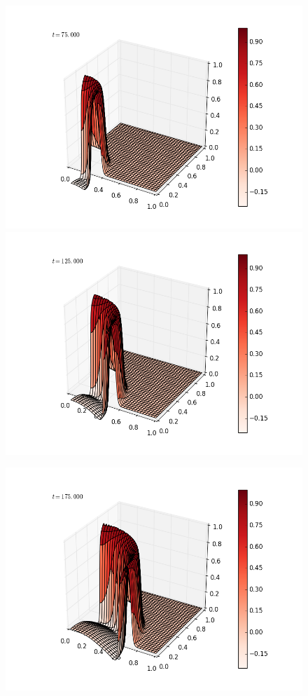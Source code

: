 \documentclass[12pt]{article}
\begin{document}
\begin{enumerate}[(a)]
\begin{figure}[H]
\end{figure}
\begin{figure}[H]
\includegraphics[scale=0.4]{partb_fast_frames/partb_fast_fig05.png}%
\includegraphics[scale=0.4]{partb_fast_frames/partb_fast_fig07.png}
\end{figure}
\begin{figure}[H]
\includegraphics[scale=0.4]{partb_fast_frames/partb_fast_fig09.png}%

\end{figure}
\end{enumerate}
\end{document}
